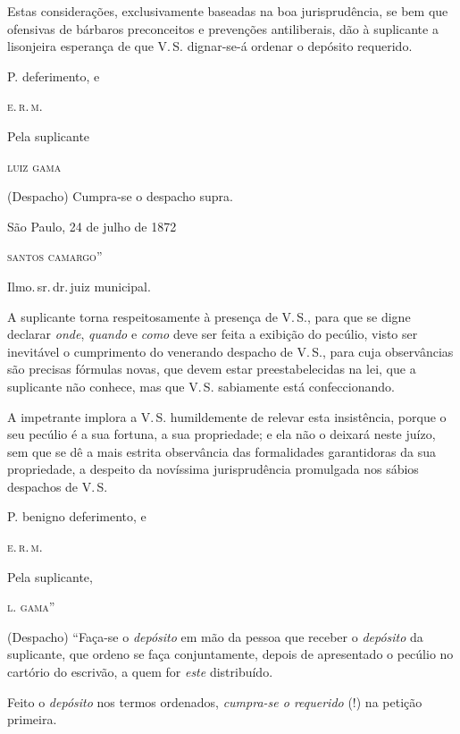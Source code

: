 Estas considerações, exclusivamente baseadas na boa jurisprudência, se
bem que ofensivas de bárbaros preconceitos e prevenções antiliberais,
dão à suplicante a lisonjeira esperança de que V.\,S. dignar-se-á ordenar
o depósito requerido.

\begin{flushright}
P. deferimento, e

\textsc{e.\,r.\,m.}

Pela suplicante

\textsc{luiz gama}
\end{flushright}

(Despacho) Cumpra-se o despacho supra.

\begin{flushright}
São Paulo, 24 de julho de 1872

\textsc{santos camargo}''
\end{flushright}

\asterisc

Ilmo.\,sr.\,dr.\,juiz municipal.

A suplicante torna respeitosamente à presença de V.\,S., para que se
digne declarar \emph{onde}, \emph{quando} e \emph{como} deve ser feita a
exibição do pecúlio, visto ser inevitável o cumprimento do venerando
despacho de V.\,S., para cuja observâncias são precisas fórmulas novas,
que devem estar preestabelecidas na lei, que a suplicante não conhece,
mas que V.\,S. sabiamente está confeccionando.

A impetrante implora a V.\,S. humildemente de relevar esta insistência,
porque o seu pecúlio é a sua fortuna, a sua propriedade; e ela não o
deixará neste juízo, sem que se dê a mais estrita observância das
formalidades garantidoras da sua propriedade, a despeito da novíssima
jurisprudência promulgada nos sábios despachos de V.\,S.

\begin{flushright}
P. benigno deferimento, e

\textsc{e.\,r.\,m.}

Pela suplicante,

\textsc{l. gama}''
\end{flushright}

(Despacho) ``Faça-se o \emph{depósito} em mão da pessoa que receber o
\emph{depósito} da suplicante, que ordeno se faça conjuntamente, depois
de apresentado o pecúlio no cartório do escrivão, a quem for \emph{este}
distribuído.

Feito o \emph{depósito} nos termos ordenados, \emph{cumpra-se o
requerido} (!) na petição primeira.

